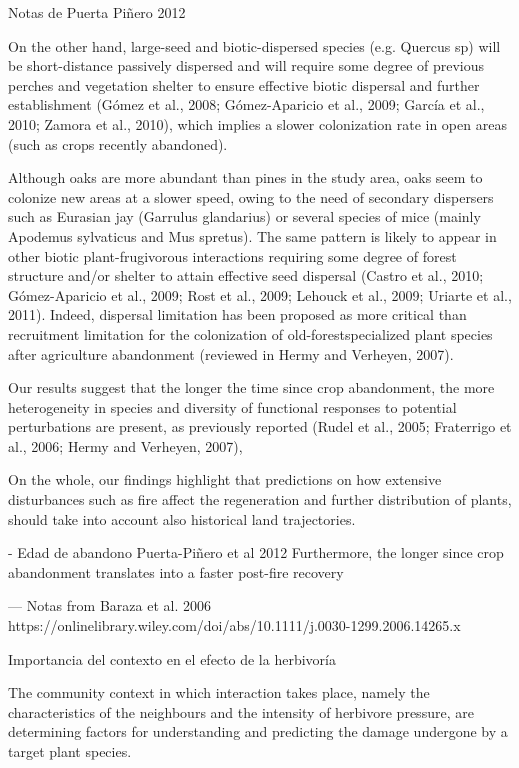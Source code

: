 Notas de Puerta Piñero 2012 

On the other hand,
large-seed and biotic-dispersed species (e.g. Quercus sp) will be
short-distance passively dispersed and will require some degree
of previous perches and vegetation shelter to ensure effective biotic dispersal and further establishment (Gómez et al., 2008;
Gómez-Aparicio et al., 2009; García et al., 2010; Zamora et al.,
2010), which implies a slower colonization rate in open areas (such
as crops recently abandoned). 


 Although oaks are more abundant
than pines in the study area, oaks seem to colonize new areas at
a slower speed, owing to the need of secondary dispersers such
as Eurasian jay (Garrulus glandarius) or several species of mice
(mainly Apodemus sylvaticus and Mus spretus). The same pattern
is likely to appear in other biotic plant-frugivorous interactions
requiring some degree of forest structure and/or shelter to attain
effective seed dispersal (Castro et al., 2010; Gómez-Aparicio et al., 2009; Rost et al., 2009; Lehouck et al., 2009; Uriarte et al., 2011). Indeed, dispersal limitation has been proposed as more critical than recruitment limitation for the colonization of old-forestspecialized plant species after agriculture abandonment (reviewed in Hermy and Verheyen, 2007).


Our results suggest that the longer the time since crop abandonment, the more heterogeneity in species and diversity of functional responses to potential perturbations are present, as
previously reported (Rudel et al., 2005; Fraterrigo et al., 2006; Hermy and Verheyen, 2007),

On the whole, our findings highlight that predictions on how
extensive disturbances such as fire affect the regeneration and further distribution of plants, should take into account also historical
land trajectories. 



- Edad de abandono
Puerta-Piñero et al 2012
 Furthermore, the longer since crop abandonment translates into a faster post-fire recovery
 
 
 
--- 
Notas from Baraza et al. 2006 https://onlinelibrary.wiley.com/doi/abs/10.1111/j.0030-1299.2006.14265.x

Importancia del contexto en el efecto de la herbivoría

The community context in which interaction takes place, namely the characteristics of the neighbours and the intensity of herbivore pressure, are determining factors for understanding and predicting the damage undergone by a target plant species.





